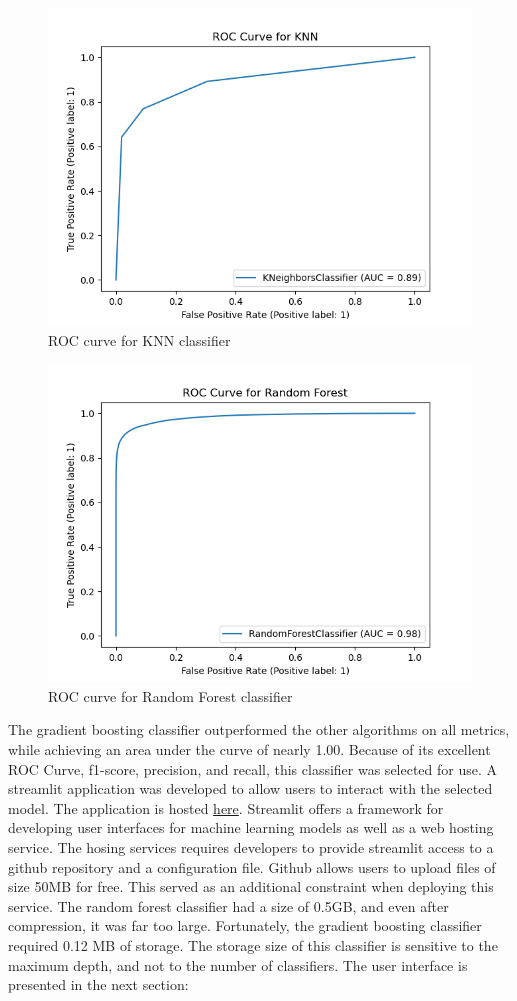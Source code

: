 \documentclass[twoside,11pt]{article}
\begin{document}
\begin{figure}[!ht]
  \centering
  \includegraphics[width=11.5cm]{./img/KNNROC.png}
  \caption{ROC curve for KNN classifier}
\end{figure}
\clearpage
\begin{figure}[!ht]
  \centering
  \includegraphics[width=11.5cm]{./img/RandomForestROC.png}
  \caption{ROC curve for Random Forest classifier}
\end{figure}
The gradient boosting classifier outperformed the other algorithms on all metrics, 
while achieving an area under the curve of nearly 1.00. Because of its excellent
ROC Curve, f1-score, precision, and recall, this classifier was selected for use.
\clearpage
A streamlit application was developed to allow users to interact with the selected model.
The application is hosted
\href{https://dmt-final-proj.streamlit.app/}{here}.
Streamlit offers a framework for developing user interfaces for machine learning models
as well as a web hosting service. The hosing services requires developers to provide
streamlit access to a github repository and a configuration file.
Github allows users to upload files of size 50MB for free. This served as an additional
constraint when deploying this service. The random forest classifier had a size of 0.5GB,
and even after compression, it was far too large. Fortunately, the gradient boosting 
classifier required 0.12 MB of storage. The storage size of this classifier is sensitive
to the maximum depth, and not to the number of classifiers.
The user interface is presented in the next section:
\end{document}
